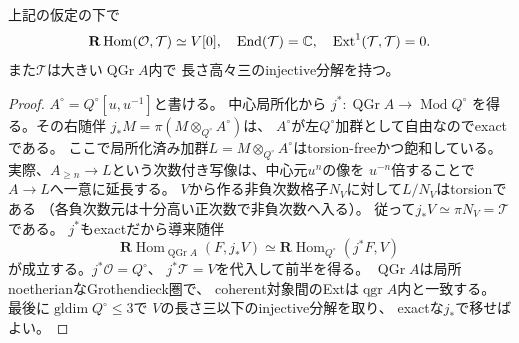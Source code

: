 \begin{lemma}[coherent対象への導来随伴]
\label{lem:quotient-chart-ext}
上記の仮定の下で
\[
 \mathbf R\operatorname{Hom}(\mathcal O,\mathcal T)
   \simeq V[0],\quad
 \operatorname{End}(\mathcal T)=\mathbb C,\quad
 \operatorname{Ext}^1(\mathcal T,\mathcal T)=0 .
\]
また$\mathcal T$は大きい$\operatorname{QGr}A$内で
長さ高々三のinjective分解を持つ。
\end{lemma}
\begin{proof}
$A^\circ=Q^\circ[u,u^{-1}]$と書ける。
中心局所化から
$j^*:\operatorname{QGr}A\to\operatorname{Mod}Q^\circ$
を得る。その右随伴
$j_*M=\pi(M\otimes_{Q^\circ}A^\circ)$は、
$A^\circ$が左$Q^\circ$加群として自由なのでexactである。
ここで局所化済み加群$L=M\otimes_{Q^\circ}A^\circ$はtorsion-freeかつ飽和している。
実際、$A_{\ge n}\to L$という次数付き写像は、中心元$u^n$の像を
$u^{-n}$倍することで$A\to L$へ一意に延長する。
$V$から作る非負次数格子$N_V$に対して$L/N_V$はtorsionである
（各負次数元は十分高い正次数で非負次数へ入る）。
従って$j_*V\simeq\pi N_V=\mathcal T$である。
$j^*$もexactだから導来随伴
\[
 \mathbf R\operatorname{Hom}_{\operatorname{QGr}A}
 (F,j_*V)\simeq
 \mathbf R\operatorname{Hom}_{Q^\circ}(j^*F,V)
\]
が成立する。$j^*\mathcal O=Q^\circ$、
$j^*\mathcal T=V$を代入して前半を得る。
$\operatorname{QGr}A$は局所noetherianなGrothendieck圏で、
coherent対象間のExtは$\operatorname{qgr}A$内と一致する。
最後に$\operatorname{gldim}Q^\circ\le3$で
$V$の長さ三以下のinjective分解を取り、
exactな$j_*$で移せばよい。
\end{proof}


